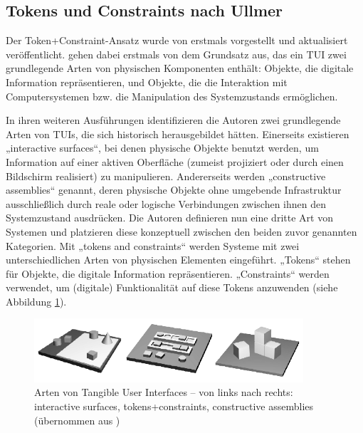
\subsection{Tokens und Constraints nach Ullmer} %
\label{sub:tokens_und_constraints_nach_ullmer}

Der Token+Constraint-Ansatz wurde von \citet{Ullmer02} erstmals vorgestellt und \citet{Ullmer05} aktualisiert veröffentlicht. \citeauthor{Ullmer05} gehen dabei erstmals von dem Grundsatz aus, das ein \gls{TUI} zwei grundlegende Arten von physischen Komponenten enthält: Objekte, die digitale Information repräsentieren, und Objekte, die die Interaktion mit Computersystemen bzw. die Manipulation des Systemzustands ermöglichen.

In ihren weiteren Ausführungen identifizieren die Autoren zwei grundlegende Arten von \glspl{TUI}, die sich historisch herausgebildet hätten. Einerseits existieren „interactive surfaces“, bei denen physische Objekte benutzt werden, um Information auf einer aktiven Oberfläche (zumeist projiziert oder durch einen Bildschirm realisiert) zu manipulieren. Andererseits werden „constructive assemblies“ genannt, deren physische Objekte ohne umgebende Infrastruktur ausschließlich durch reale oder logische Verbindungen zwischen ihnen den Systemzustand ausdrücken. Die Autoren definieren nun eine dritte Art von Systemen und platzieren diese konzeptuell zwischen den beiden zuvor genannten Kategorien. Mit „tokens and constraints“ werden Systeme mit zwei unterschiedlichen Arten von physischen Elementen eingeführt. „Tokens“ stehen für Objekte, die digitale Information repräsentieren. „Constraints“ werden verwendet, um (digitale) Funktionalität auf diese Tokens anzuwenden (siehe Abbildung \ref{fig:img_ImplementierungUeberblick_is_tac_ca}).

\begin{figure}[htbp]
	\centering
		\includegraphics[width=10cm]{img/ImplementierungUeberblick/is_tac_ca.png}
	\caption[Arten von Tangible User Interfaces]{Arten von Tangible User Interfaces -- von links nach rechts: interactive surfaces, tokens+constraints, constructive assemblies (übernommen aus \citet{Ullmer05})}
	\label{fig:img_ImplementierungUeberblick_is_tac_ca}
\end{figure}

